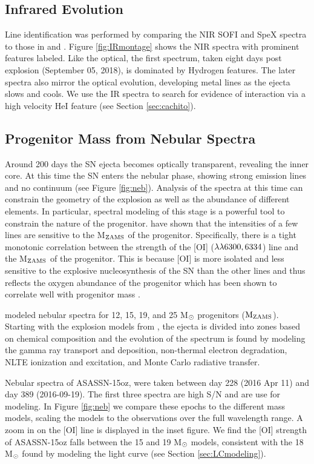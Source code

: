 \documentclass[a4paper,fleqn,usenatbib]{mnras}
\begin{document}
\subsection{Infrared Evolution}
Line identification was performed by comparing the NIR SOFI and SpeX spectra to those in \citet{2015valenti} and \citet{2018tomasella}.
Figure \ref{fig:IRmontage} shows the NIR spectra with prominent features labeled.
Like the optical, the first spectrum, taken eight days post explosion (September 05, 2018), is dominated by Hydrogen features.
The later spectra also mirror the optical evolution, developing metal lines as the ejecta slows and cools.
We use the IR spectra to search for evidence of interaction via a high velocity HeI feature (see Section \ref{sec:cachito}).
\subsection{Progenitor Mass from Nebular Spectra} \label{sec:nebular}
Around 200 days the SN ejecta becomes optically transparent, revealing the inner core. 
At this time the SN enters the nebular phase, showing strong emission lines and no continuum (see Figure \ref{fig:neb}).
Analysis of the spectra at this time can constrain the geometry of the explosion as well as the abundance of different elements.
In particular, spectral modeling of this stage is a powerful tool to constrain the nature of the progenitor.
\citet{2012jerkstrand,2014jerkstrand} have shown that the intensities of a few lines are sensitive to the M$\rm{_{ZAMS}}$ of the progenitor.
Specifically, there is a tight monotonic correlation between the strength of the [OI] ($\rm{\lambda\lambda6300, 6334}$) line and the M$\rm{_{ZAMS}}$ of the progenitor.
This is because [OI] is more isolated and less sensitive to the explosive nucleosynthesis of the SN than the other lines and thus reflects the oxygen abundance of the progenitor which has been shown to correlate well with progenitor mass \citep{1995woosley}.

\citet{2014jerkstrand} modeled nebular spectra for 12, 15, 19, and 25 M$\rm{_{\odot}}$ progenitors ($\rm{M_{ZAMS}}$).
Starting with the explosion models from \citet{2007woosley}, the ejecta is divided into zones based on chemical composition and the evolution of the spectrum is found by modeling the gamma ray transport and deposition, non-thermal electron degradation, NLTE ionization and excitation, and Monte Carlo radiative transfer.

Nebular spectra of ASASSN-15oz, were taken between day 228 (2016 Apr 11) and  day 389 (2016-09-19).
The first three spectra are high S/N and are use for modeling.
In Figure \ref{fig:neb} we compare these epochs to the different mass models, scaling the models to the observations over the full wavelength range. 
A zoom in on the [OI] line is displayed in the inset figure. 
We find the [OI] strength of ASASSN-15oz falls between the 15 and 19 M$\rm{_\odot}$ models, consistent with the 18 M$\rm{_{\odot}}$ found by modeling the light curve (see Section \ref{sec:LCmodeling}).
\end{document}
